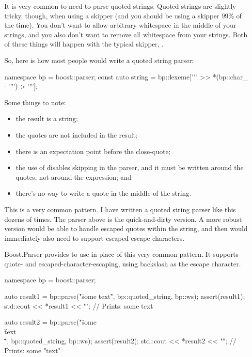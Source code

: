 \documentclass{MyBook}
\begin{document}
It is very common to need to parse quoted strings. Quoted strings are slightly tricky, though, when using a skipper (and you should be using a skipper 99\% of the time). You don't want to allow arbitrary whitespace in the middle of your strings, and you also don't want to remove all whitespace from your strings. Both of these things will happen with the typical skipper, .

So, here is how most people would write a quoted string parser:

\begin{code}
namespace bp = boost::parser;
const auto string = bp::lexeme['"' >> *(bp::char_ - '"') > '"'];
\end{code}

Some things to note:

\begin{itemize}
\item
  the result is a string;
\item
  the quotes are not included in the result;
\item
  there is an expectation point before the close-quote;
\item
  the use of  disables skipping in the parser, and it must be written around the quotes, not around the  expression; and
\item
  there's no way to write a quote in the middle of the string.
\end{itemize}

This is a very common pattern. I have written a quoted string parser like this dozens of times. The parser above is the quick-and-dirty version. A more robust version would be able to handle escaped quotes within the string, and then would immediately also need to support escaped escape characters.

Boost.Parser provides  to use in place of this very common pattern. It supports quote- and escaped-character-escaping, using backslash as the escape character.

\begin{code}
namespace bp = boost::parser;

auto result1 = bp::parse("\"some text\"", bp::quoted_string, bp::ws);
assert(result1);
std::cout << *result1 << "\n"; // Prints: some text

auto result2 =
    bp::parse("\"some \\\"text\\\"\"", bp::quoted_string, bp::ws);
assert(result2);
std::cout << *result2 << "\n"; // Prints: some "text"
\end{code}
\end{document}

